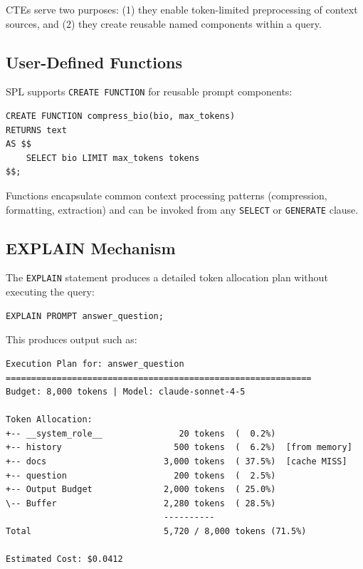 \documentclass[11pt,a4paper]{article}
\begin{document}
CTEs serve two purposes: (1) they enable token-limited preprocessing of context sources, and (2) they create reusable named components within a query.

\subsection{User-Defined Functions}

SPL supports \texttt{CREATE FUNCTION} for reusable prompt components:

\begin{lstlisting}[language=SPL, caption={User-defined function}]
CREATE FUNCTION compress_bio(bio, max_tokens)
RETURNS text
AS $$
    SELECT bio LIMIT max_tokens tokens
$$;
\end{lstlisting}

Functions encapsulate common context processing patterns (compression, formatting, extraction) and can be invoked from any \texttt{SELECT} or \texttt{GENERATE} clause.

\subsection{EXPLAIN Mechanism}

The \texttt{EXPLAIN} statement produces a detailed token allocation plan without executing the query:

\begin{lstlisting}[language=SPL, caption={EXPLAIN for execution plan transparency}]
EXPLAIN PROMPT answer_question;
\end{lstlisting}

This produces output such as:

\begin{verbatim}
Execution Plan for: answer_question
============================================================
Budget: 8,000 tokens | Model: claude-sonnet-4-5

Token Allocation:
+-- __system_role__               20 tokens  (  0.2%)
+-- history                      500 tokens  (  6.2%)  [from memory]
+-- docs                       3,000 tokens  ( 37.5%)  [cache MISS]
+-- question                     200 tokens  (  2.5%)
+-- Output Budget              2,000 tokens  ( 25.0%)
\-- Buffer                     2,280 tokens  ( 28.5%)
                               ----------
Total                          5,720 / 8,000 tokens (71.5%)

Estimated Cost: $0.0412
\end{verbatim}
\end{document}
